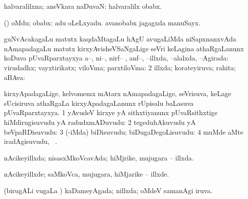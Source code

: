 {\bentry
{} 
\gl{\gu}
\expl{}
\bmng
halvaralilxna; aneVkara naDuvaN:  halvaralilx obabx. 
\emng
\eentry

\bentry
{} 
\gl{\gu}
\expl{}
\bmng
{} 
\emng
\eentry

\bentry
{} 
\gl{\saMkiSx}
\expl{}
\bmng
{} 
\emng
\eentry

\bentry
{} 
\gl{\nA}
\expl{}
\bmng
\sA (\AmA) oMdu; obabx:  adu oLeLxyadu.  avanobabx jagagxda manuSayx. 
\emng
\eentry

\bentry
{} 
\gl{\pUparx}
\expl{}
\bmng
\bnum
{} guNvAcakagaLu matutx kaqdaMtagaLu hAgU avugaLiMda niSapxnanxvAda nAmapadagaLu matutx kirxyAvisheVSaNgaLige seVri keLagina athaRgaLanunx koDuva pUvaRparxtayxya 
\banum
{} a--, ni--, nirf-- , anf--, --illxda, --alalxda, --Agirada:  
 virudadhx; vayxtirikatx; viloVma; parxtiloVma:  
\eanum
\numie
\num{2} illxda; korateyiruva; rahita; aBAva:  
\enum
\emng
\eentry

\bentry
{} 
\gl{\pUparx}
\expl{}
\bmng
kirxyApadagaLige, kelvomemx mAtarx nAmapadagaLige, seVrisuva, keLage sUcisiruva athaRgaLa kirxyApadagaLanunx rUpisalu baLasuva pUvaRparxtayxya. 
\bnum
\num{1} yAvudeV kirxye yA sithxtiyanunx pUvaRsithxtige hiMdirugisuvudu yA radudxmADuvudu:  
\num{2} tegeduhAkuvudu yA beVpaRDisuvudu:  
\num{3} (-iMda) biDisuvudu; biDugaDegoLisuvudu:  
\num{4} muMde aMte iradAgisuvudu, \udA\ . 
\enum
\emng
\eentry

\bentry
{}
\gl{\saMkiSx}
\expl{}
\bmng
{} 
\emng
\eentry

\bentry
{} 
\gl{\gu}
\expl{}
\bmng
nAcikeyillxda; nisasxMkoVcavAda; hiMjrike, mujugara -- illxda. 
\emng
\eentry

\bentry
{} 
\gl{\kirxvi}
\expl{}
\bmng
nAcikeyillxde; saMkoVca, mujugara, hiMjarike -- illxde. 
\emng
\eentry

\bentry
{} 
\gl{\gu}
\expl{}
\bmng
(birugALi \mo vugaLa \vi) kaDameyAgada; nillxda; oMdeV samanAgi iruva. 
\emng
\eentry

}
